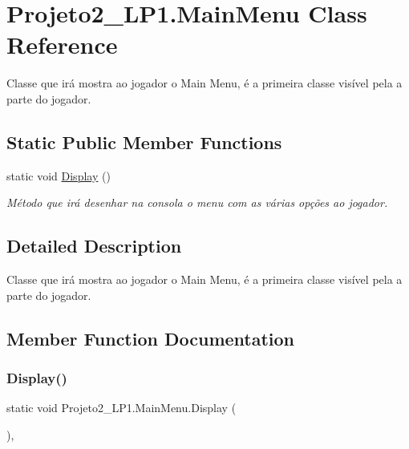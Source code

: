 \hypertarget{class_projeto2___l_p1_1_1_main_menu}{}\section{Projeto2\+\_\+\+L\+P1.\+Main\+Menu Class Reference}
\label{class_projeto2___l_p1_1_1_main_menu}


Classe que irá mostra ao jogador o Main Menu, é a primeira classe visível pela a parte do jogador.  


\subsection*{Static Public Member Functions}
\begin{DoxyCompactItemize}
\item 
static void \mbox{\hyperlink{class_projeto2___l_p1_1_1_main_menu_a9131e137b57fb7594d7f68015945686e}{Display}} ()
\begin{DoxyCompactList}\small\item\em Método que irá desenhar na consola o menu com as várias opções ao jogador. \end{DoxyCompactList}\end{DoxyCompactItemize}


\subsection{Detailed Description}
Classe que irá mostra ao jogador o Main Menu, é a primeira classe visível pela a parte do jogador. 



\subsection{Member Function Documentation}
\mbox{\label{class_projeto2___l_p1_1_1_main_menu_a9131e137b57fb7594d7f68015945686e}} 
\subsubsection{\texorpdfstring{Display()}{Display()}}
{\footnotesize\ttfamily static void Projeto2\+\_\+\+L\+P1.\+Main\+Menu.\+Display (\begin{DoxyParamCaption}{ }\end{DoxyParamCaption})\hspace{0.3cm}{\ttfamily [inline]}, {\ttfamily [static]}}



